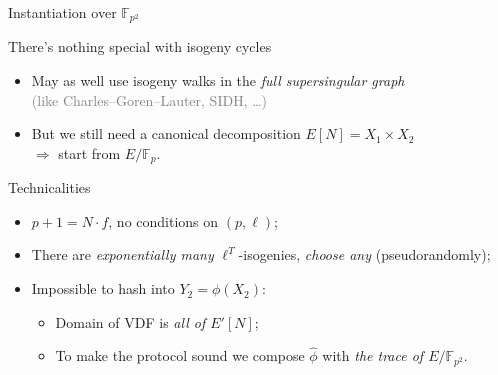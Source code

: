 \documentclass[aspectratio=169]{beamer}
\newcommand{\F}{\mathbb{F}}
\begin{document}

\begin{frame}{Instantiation over $\F_{p^2}$}
  \begin{block}{There's nothing special with isogeny cycles}
    \begin{itemize}
    \item May as well use isogeny walks in the \emph{full
        supersingular graph}\\
      \textcolor{gray}{(like Charles--Goren--Lauter, SIDH, \dots)}
    \item But we still need a canonical decomposition
      \emph{$E[N]=X_1\times X_2$}\\
      $\Rightarrow$ start from \emph{$E/\F_p$}.
    \end{itemize}
  \end{block}

  \begin{block}{Technicalities}
    \begin{itemize}
    \item<2-> \emph{$p+1=N\cdot f$}, no conditions on \emph{$(p,\ell)$};
    \item<3-> There are \emph{exponentially many} $\ell^T$-isogenies,
      \emph{choose any} (pseudorandomly);
    \item<4-> Impossible to hash into $Y_2=\phi(X_2)$:
      \begin{itemize}
      \item Domain of VDF is \emph{all of $E'[N]$};
      \item To make the protocol sound we compose $\hat\phi$ with
        \emph{the trace of $E/\F_{p^2}$}.
      \end{itemize}
    \end{itemize}
  \end{block}
\end{frame}

\end{document}
